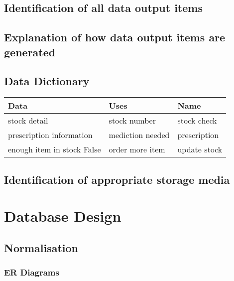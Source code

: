 \subsection{Identification of all data output items}

\subsection{Explanation of how data output items are generated}

\subsection{Data Dictionary}
\begin{table}[H]
\begin{tabular}{|l|l|l|}
\hline
Data & Uses & Name \\
\hline
stock detail & stock number & stock check\\
\hline
prescription information & mediction needed & prescription\\
\hline
enough item in stock False & order more item & update stock\\
\hline
\end{tabular}
\end{table}

\subsection{Identification of appropriate storage media}

\section{Database Design}

\subsection{Normalisation}

\subsubsection{ER Diagrams}

